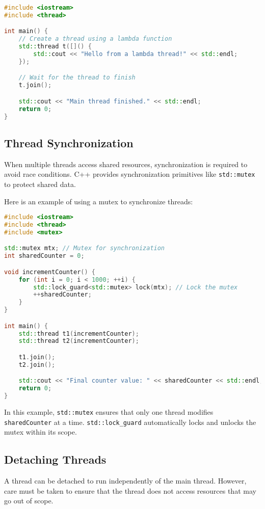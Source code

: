 \begin{lstlisting}[language=C++]
#include <iostream>
#include <thread>

int main() {
    // Create a thread using a lambda function
    std::thread t([]() {
        std::cout << "Hello from a lambda thread!" << std::endl;
    });

    // Wait for the thread to finish
    t.join();

    std::cout << "Main thread finished." << std::endl;
    return 0;
}
\end{lstlisting}

\subsection{Thread Synchronization}
When multiple threads access shared resources, synchronization is required to avoid race conditions. C++ provides synchronization primitives like \texttt{std::mutex} to protect shared data.

Here is an example of using a mutex to synchronize threads:

\begin{lstlisting}[language=C++]
#include <iostream>
#include <thread>
#include <mutex>

std::mutex mtx; // Mutex for synchronization
int sharedCounter = 0;

void incrementCounter() {
    for (int i = 0; i < 1000; ++i) {
        std::lock_guard<std::mutex> lock(mtx); // Lock the mutex
        ++sharedCounter;
    }
}

int main() {
    std::thread t1(incrementCounter);
    std::thread t2(incrementCounter);

    t1.join();
    t2.join();

    std::cout << "Final counter value: " << sharedCounter << std::endl;
    return 0;
}
\end{lstlisting}

In this example, \texttt{std::mutex} ensures that only one thread modifies \texttt{sharedCounter} at a time.
\texttt{std::lock\_guard} automatically locks and unlocks the mutex within its scope.

\subsection{Detaching Threads}
A thread can be detached to run independently of the main thread. 
However, care must be taken to ensure that the thread does not access 
resources that may go out of scope.

